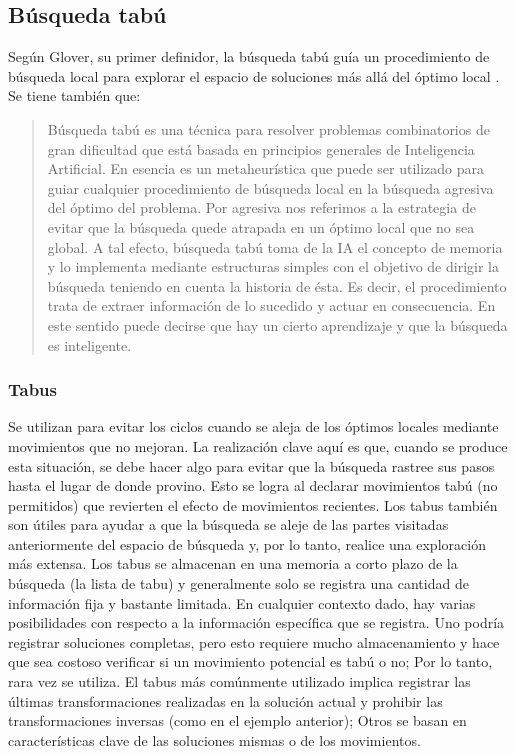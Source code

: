 \subsection{Búsqueda tabú}
Según Glover, su primer definidor, la búsqueda tabú guía un procedimiento de búsqueda local para explorar el espacio de soluciones más allá del óptimo local \cite{RiojasCanari2005BusquedaN-reinas}. 
Se tiene también que:
\begin{quote}Búsqueda tabú es una técnica para resolver problemas combinatorios de gran dificultad que está basada en principios generales de Inteligencia Artificial. En esencia es un metaheurística que puede ser utilizado para guiar cualquier procedimiento de búsqueda local en la búsqueda agresiva del óptimo del problema. Por agresiva nos referimos a la estrategia de evitar que la búsqueda quede atrapada en un óptimo local que no sea global. A tal efecto, búsqueda tabú toma de la IA el concepto de memoria y lo implementa mediante estructuras simples con el objetivo de dirigir la búsqueda teniendo en cuenta la historia de ésta. Es decir, el procedimiento trata de extraer información de lo sucedido y actuar en consecuencia. En este sentido puede decirse que hay un cierto aprendizaje y que la búsqueda es inteligente. \cite{MartiProcedimientosCombinatoria}\end{quote}
\subsubsection{Tabus}
Se utilizan para evitar los ciclos cuando se aleja de los óptimos locales mediante movimientos que no mejoran. La realización clave aquí es que, cuando se produce esta situación, se debe hacer algo para evitar que la búsqueda rastree sus pasos hasta el lugar de donde provino. Esto se logra al declarar movimientos tabú (no permitidos) que revierten el efecto de movimientos recientes. Los tabus también son útiles para ayudar a que la búsqueda se aleje de las partes visitadas anteriormente del espacio de búsqueda y, por lo tanto, realice una exploración más extensa. Los tabus se almacenan en una memoria a corto plazo de la búsqueda (la lista de tabu) y generalmente solo se registra una cantidad de información fija y bastante limitada. En cualquier contexto dado, hay varias posibilidades con respecto a la información específica que se registra. Uno podría registrar soluciones completas, pero esto requiere mucho almacenamiento y hace que sea costoso verificar si un movimiento potencial es tabú o no; Por lo tanto, rara vez se utiliza. El tabus más comúnmente utilizado implica registrar las últimas transformaciones realizadas en la solución actual y prohibir las transformaciones inversas (como en el ejemplo anterior); Otros se basan en características clave de las soluciones mismas o de los movimientos. \cite{2010HandbookMetaheuristics}
